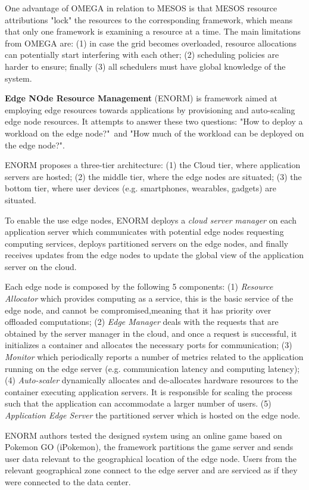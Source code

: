 One advantage of OMEGA in relation to MESOS is that MESOS resource attributions "lock" the resources to the corresponding framework,  which means that only one framework is examining a resource at a time. The main limitations from OMEGA are: (1) in case the grid becomes overloaded, resource allocations can potentially start interfering with each other; (2) scheduling policies are harder to ensure; finally (3) all schedulers must have global knowledge of the system.

\textbf{Edge NOde Resource Management} \cite{wang2017enorm} (ENORM) is framework aimed at employing edge resources towards applications by provisioning and auto-scaling edge node resources. It attempts to answer these two questions: "How to deploy a workload on the edge node?"\ and "How much of the workload can be deployed on the edge node?".

ENORM proposes a three-tier architecture: (1) the Cloud tier, where application servers are hosted; (2) the middle tier, where the edge nodes are situated; (3) the bottom tier, where user devices (e.g. smartphones, wearables, gadgets) are situated. 

To enable the use edge nodes, ENORM deploys a \textit{cloud server manager} on each application server which communicates with potential edge nodes requesting computing services, deploys partitioned servers on the edge nodes, and finally receives updates from the edge nodes to update the global view of the application server on the cloud.

Each edge node is composed by the following 5 components: (1) \textit{Resource Allocator} which provides computing as a service, this is the basic service of the edge node, and cannot be compromised,meaning that it has priority over offloaded computations; (2) \textit{Edge Manager} deals with the requests that are obtained by the server manager in the cloud, and once a request is successful, it initializes a container and allocates the necessary ports for communication; (3) \textit{Monitor} which periodically reports a number of metrics related to the application running on the edge server (e.g. communication latency and computing latency); (4) \textit{Auto-scaler} dynamically allocates and de-allocates hardware resources to the container executing application servers. It is responsible for scaling the process such that the application can accommodate a larger number of users. (5) \textit{Application Edge Server} the partitioned server which is hosted on the edge node.

ENORM authors tested the designed system using an online game based on Pokemon GO (iPokemon)\cite{pokemonGo}, the framework partitions the game server and sends  user data relevant to the geographical location of the edge node. Users from the relevant geographical zone connect to the edge server and are serviced as if they were connected to the data center. 

